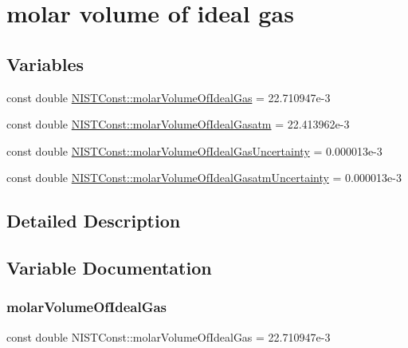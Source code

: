 \hypertarget{group___molar_volume}{}\section{molar volume of ideal gas}
\label{group___molar_volume}
\subsection*{Variables}
\begin{DoxyCompactItemize}
\item 
const double \hyperlink{group___molar_volume_ga666dc78c2b916ed12bcaf3ec15d7c4d3}{N\+I\+S\+T\+Const\+::molar\+Volume\+Of\+Ideal\+Gas} = 22.\+710947e-\/3
\item 
const double \hyperlink{group___molar_volume_ga005e08baa33a25a474bd2287281883c4}{N\+I\+S\+T\+Const\+::molar\+Volume\+Of\+Ideal\+Gasatm} = 22.\+413962e-\/3
\item 
const double \hyperlink{group___molar_volume_ga61a743451588f97b027f4ac314ced50a}{N\+I\+S\+T\+Const\+::molar\+Volume\+Of\+Ideal\+Gas\+Uncertainty} = 0.\+000013e-\/3
\item 
const double \hyperlink{group___molar_volume_gaff48f0b13c5f974735f0826b7585a0c7}{N\+I\+S\+T\+Const\+::molar\+Volume\+Of\+Ideal\+Gasatm\+Uncertainty} = 0.\+000013e-\/3
\end{DoxyCompactItemize}


\subsection{Detailed Description}


\subsection{Variable Documentation}
\mbox{\label{group___molar_volume_ga666dc78c2b916ed12bcaf3ec15d7c4d3}} 
\subsubsection{\texorpdfstring{molar\+Volume\+Of\+Ideal\+Gas}{molarVolumeOfIdealGas}}
{\footnotesize\ttfamily const double N\+I\+S\+T\+Const\+::molar\+Volume\+Of\+Ideal\+Gas = 22.\+710947e-\/3}

